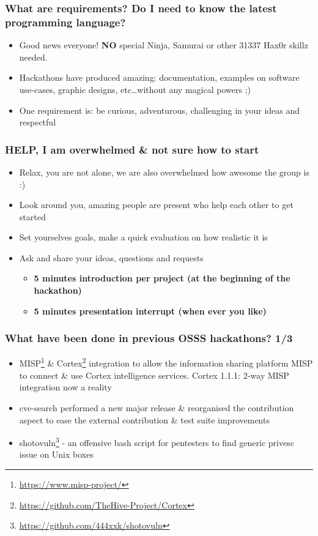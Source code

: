 \documentclass{beamer}
\begin{document}
  \begin{frame}
    \frametitle{What are requirements? Do I need to know the latest programming language?}
    \begin{itemize}
      \item Good news everyone! {\bf NO} special Ninja, Samurai or other 31337 Hax0r skillz needed.
      \item Hackathons have produced amazing: documentation, examples on software use-cases, graphic designs, etc\ldots without any magical powers ;)
      \item One requirement is: be curious, adventurous, challenging in your ideas and respectful
    \end{itemize}
  \end{frame}

  \begin{frame}
    \frametitle{HELP, I am overwhelmed \& not sure how to start}
    \begin{itemize}
      \item Relax, you are not alone, we are also overwhelmed how awesome the group is :)
      \item Look around you, amazing people are present who help each other to get started
      \item Set yourselves goals, make a quick evaluation on how realistic it is
      \item Ask and share your ideas, questions and requests
              \begin{itemize}
                      \item {\bf 5 minutes introduction per project (at the beginning of the hackathon)}
                      \item {\bf 5 minutes presentation interrupt (when ever you like)}
              \end{itemize}
    \end{itemize}
  \end{frame}

  \begin{frame}
    \frametitle{What have been done in previous OSSS hackathons? 1/3}
    \begin{itemize}
      \item MISP\footnote{\url{https://www.misp-project/}} \& Cortex\footnote{\url{https://github.com/TheHive-Project/Cortex}} integration to allow the information sharing platform MISP to connect \& use Cortex intelligence services. Cortex 1.1.1: 2-way MISP integration now a reality
      \item cve-search performed a new major release \& reorganised the contribution aspect to ease the external contribution \& test suite improvements
      \item shotovuln\footnote{\url{https://github.com/444xxk/shotovuln}} - an offensive bash script for pentesters to find generic privesc issue on Unix boxes
    \end{itemize}
  \end{frame}
\end{document}
